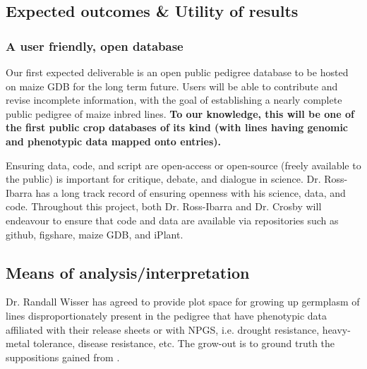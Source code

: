\documentclass[12pt]{article}
\begin{document}
\subsection*{Expected outcomes \& Utility of results}

\subsubsection*{A user friendly, open database}

Our first expected deliverable is an open public pedigree database to be hosted on maize GDB for the long term future. Users will be able to contribute and revise incomplete information, with the goal of establishing a nearly complete public pedigree of maize inbred lines. \textbf{To our knowledge, this will be one of the first public crop databases of its kind (with lines having genomic and phenotypic data mapped onto entries).}
\par Ensuring data, code, and script are open-access or open-source (freely available to the public) is important for critique, debate, and dialogue in science. Dr. Ross-Ibarra has a long track record of ensuring openness with his science, data, and code. Throughout this project, both Dr. Ross-Ibarra and Dr. Crosby will endeavour to ensure that code and data are available via repositories such as github, figshare, maize GDB, and iPlant.


 


\subsection*{Means of analysis/interpretation}
Dr. Randall Wisser has agreed to provide plot space for growing up germplasm of lines disproportionately present in the pedigree that have phenotypic data affiliated with their release sheets or with NPGS, i.e. drought resistance, heavy-metal tolerance, disease resistance, etc. The grow-out is to ground truth the suppositions gained from \citep{Berg:2014bs}.
\end{document}

